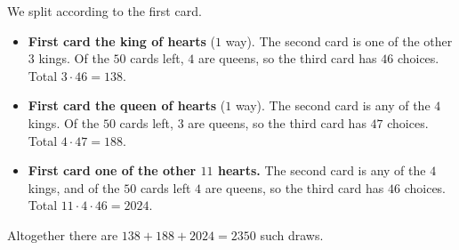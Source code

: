 We split according to the first card.
\begin{itemize}
\item \textbf{First card the king of hearts} ($1$ way). The second card is one of the other $3$ kings. Of the $50$ cards left, $4$ are queens, so the third card has $46$ choices. Total $3\cdot46=138$.
\item \textbf{First card the queen of hearts} ($1$ way). The second card is any of the $4$ kings. Of the $50$ cards left, $3$ are queens, so the third card has $47$ choices. Total $4\cdot47=188$.
\item \textbf{First card one of the other $11$ hearts.} The second card is any of the $4$ kings, and of the $50$ cards left $4$ are queens, so the third card has $46$ choices. Total $11\cdot4\cdot46=2024$.
\end{itemize}
Altogether there are $138+188+2024=\boxed{2350}$ such draws.
